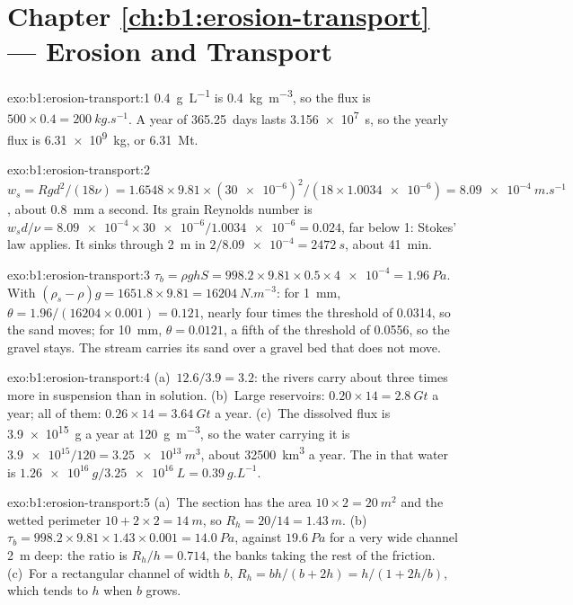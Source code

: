 \section*{Chapter \ref{ch:b1:erosion-transport} --- Erosion and Transport}

\begin{solution}{exo:b1:erosion-transport:1}
\qty{0.4}{g.L^{-1}} is \qty{0.4}{kg.m^{-3}}, so the flux is $500 \times 0.4 =
\qty{200}{kg.s^{-1}}$. A year of \num{365.25}~days lasts
\qty{3.156e7}{s}, so the yearly flux is \qty{6.31e9}{kg}, or
\qty{6.31}{Mt}.
\end{solution}

\begin{solution}{exo:b1:erosion-transport:2}
$w_s = R g d^2/(18\nu) = 1.6548 \times 9.81 \times (\num{30e-6})^2/(18 \times
\num{1.0034e-6}) = \qty{8.09e-4}{m.s^{-1}}$, about \qty{0.8}{mm} a second. Its
grain Reynolds number is $w_s d/\nu = \num{8.09e-4} \times
\num{30e-6}/\num{1.0034e-6} = 0.024$, far below 1: Stokes' law applies. It
sinks through \qty{2}{m} in $2/\num{8.09e-4} = \qty{2472}{s}$, about
\qty{41}{min}.
\end{solution}

\begin{solution}{exo:b1:erosion-transport:3}
$\tau_b = \rho g h S = 998.2 \times 9.81 \times 0.5 \times \num{4e-4} =
\qty{1.96}{Pa}$. With $(\rho_s - \rho) g = 1651.8 \times 9.81 =
\qty{16204}{N.m^{-3}}$: for \qty{1}{mm}, $\theta = 1.96/(16204 \times 0.001) =
0.121$, nearly four times the threshold of \num{0.0314}, so the sand moves; for
\qty{10}{mm}, $\theta = 0.0121$, a fifth of the threshold of \num{0.0556}, so the
gravel stays. The stream carries its sand over a gravel bed that does not move.
\end{solution}

\begin{solution}{exo:b1:erosion-transport:4}
(a)~$12.6/3.9 = 3.2$: the rivers carry about three times more in suspension
than in solution. (b)~Large reservoirs: $0.20 \times 14 = \qty{2.8}{Gt}$ a
year; all of them: $0.26 \times 14 = \qty{3.64}{Gt}$ a year. (c)~The dissolved
flux is \qty{3.9e15}{g} a year at \qty{120}{g.m^{-3}}, so the water carrying it
is $\num{3.9e15}/120 = \qty{3.25e13}{m^3}$, about \qty{32500}{km^3} a year. The
 in that water is $\qty{1.26e16}{g}/\qty{3.25e16}{L} =
\qty{0.39}{g.L^{-1}}$.
\end{solution}

\begin{solution}{exo:b1:erosion-transport:5}
(a)~The section has the area $10 \times 2 = \qty{20}{m^2}$ and the wetted
perimeter $10 + 2 \times 2 = \qty{14}{m}$, so $R_h = 20/14 = \qty{1.43}{m}$.
(b)~$\tau_b = 998.2 \times 9.81 \times 1.43 \times 0.001 = \qty{14.0}{Pa}$,
against $\qty{19.6}{Pa}$ for a very wide channel \qty{2}{m} deep: the ratio is
$R_h/h = 0.714$, the banks taking the rest of the friction. (c)~For a
rectangular channel of width $b$, $R_h = bh/(b + 2h) = h/(1 + 2h/b)$, which
tends to $h$ when $b$ grows.
\end{solution}

